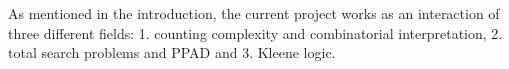 
As mentioned in the introduction, the current project works as an interaction
of three different fields: 1. counting complexity and combinatorial interpretation, 
2. total search problems and PPAD and 3. Kleene logic.



